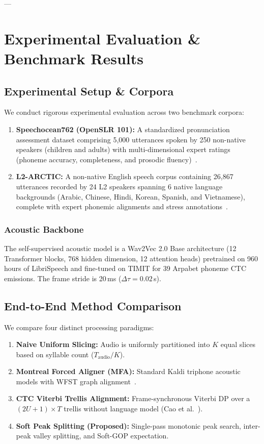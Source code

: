 \documentclass[10pt,conference]{IEEEtran}
\begin{document}
---

\section{Experimental Evaluation \& Benchmark Results}
\label{sec:experiments}

\subsection{Experimental Setup \& Corpora}
We conduct rigorous experimental evaluation across two benchmark corpora:
\begin{enumerate}
    \item \textbf{Speechocean762 (OpenSLR 101):} A standardized pronunciation assessment dataset comprising 5,000 utterances spoken by 250 non-native speakers (children and adults) with multi-dimensional expert ratings (phoneme accuracy, completeness, and prosodic fluency)~\cite{zhang2021speechocean762}.
    \item \textbf{L2-ARCTIC:} A non-native English speech corpus containing 26,867 utterances recorded by 24 L2 speakers spanning 6 native language backgrounds (Arabic, Chinese, Hindi, Korean, Spanish, and Vietnamese), complete with expert phonemic alignments and stress annotations~\cite{zhao2018l2arctic}.
\end{enumerate}

\subsubsection{Acoustic Backbone}
The self-supervised acoustic model is a Wav2Vec 2.0 Base architecture (12 Transformer blocks, 768 hidden dimension, 12 attention heads) pretrained on 960 hours of LibriSpeech and fine-tuned on TIMIT for 39 Arpabet phoneme CTC emissions. The frame stride is 20\,ms ($\Delta \tau = 0.02$\,s).

\subsection{End-to-End Method Comparison}
We compare four distinct processing paradigms:
\begin{enumerate}
    \item \textbf{Naive Uniform Slicing:} Audio is uniformly partitioned into $K$ equal slices based on syllable count ($T_{\text{audio}} / K$).
    \item \textbf{Montreal Forced Aligner (MFA):} Standard Kaldi triphone acoustic models with WFST graph alignment~\cite{mcauliffe2017montreal}.
    \item \textbf{CTC Viterbi Trellis Alignment:} Frame-synchronous Viterbi DP over a $(2U+1) \times T$ trellis without language model (Cao et al.~\cite{cao2024framework}).
    \item \textbf{Soft Peak Splitting (Proposed):} Single-pass monotonic peak search, inter-peak valley splitting, and Soft-GOP expectation.
\end{enumerate}
\end{document}
